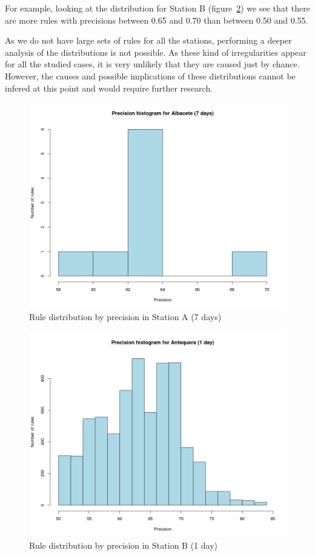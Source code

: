 For example, looking at the distribution for Station B (figure~\ref{fig:hist_ant1}) we see that there are more rules with precisions between 0.65 and 0.70 than between 0.50 and 0.55.

As we do not have large sets of rules for all the stations, performing a deeper analysis of the distributions is not possible. As these kind of irregularities appear for all the studied cases, it is very unlikely that they are caused just by chance. However, the causes and possible implications of these distributions cannot be infered at this point and would require further research.

\begin{figure}[hbtp]
\includegraphics[width=\textwidth]{img/hist_alb7.png}
\caption{Rule distribution by precision in Station A (7 days)} \label{fig:hist_alb7}
\end{figure}

\begin{figure}[hbtp]
\includegraphics[width=\textwidth]{img/hist_ant1.png}
\caption{Rule distribution by precision in Station B (1 day)} \label{fig:hist_ant1}
\end{figure}

